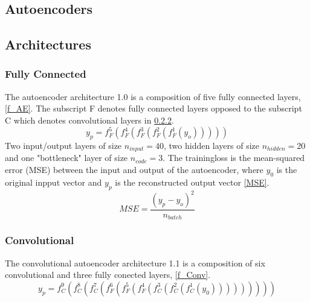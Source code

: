 \documentclass[12pt, a4paper]{article}
\begin{document}
\subsection{Autoencoders}
\subsection{Architectures}
\subsubsection{Fully Connected}\label{Fully Connected}
The autoencoder architecture 1.0 is a composition of five fully connected layers, \cref{f_AE}. The subscript F denotes fully connected layers opposed to the subscript C which denotes convolutional layers in \cref{Convolutional}.
\begin{equation}
	y_p = f_{F}^5(f_{F}^4(f_{F}^3(f_{F}^2(f_{F}^1(y_o)))))
	\label{f_AE}
\end{equation}
Two input/output layers of size $n_{input}=40$, two hidden layers of size $n_{hidden} = 20$ and one "bottleneck" layer of size $n_{code} = 3$. The trainingloss is the mean-squared error (MSE) between the input and output of the autoencoder, where $y_0$ is the original inpput vector and $y_p$ is the reconstructed output vector \cref{MSE}.
\begin{equation}
	MSE = \frac{(y_p - y_o)^2}{n_{batch}}
	\label{MSE}
\end{equation}
\subsubsection{Convolutional}\label{Convolutional}
The convolutional autoencoder architecture 1.1 is a composition of six convolutional and three fully conected layers, \cref{f_Conv}.
\begin{equation}
y_p = f_{C}^9(f_{C}^8(f_{C}^7(f_{F}^6(f_{F}^5(f_{F}^4(f_{C}^3(f_{C}^2(f_{C}^1(y_0)))))))))
\label{f_Conv}
\end{equation}
\end{document}
